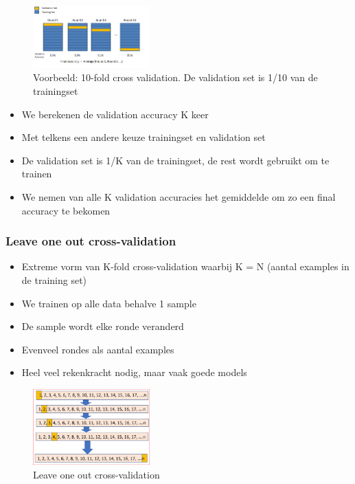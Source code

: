 \documentclass{article}
\begin{document}
\begin{figure}[H]
    \centering
    \includegraphics[width=0.4\textwidth]{cross-validation-kfold.png}
    \caption{Voorbeeld: 10-fold cross validation. De validation set is 1/10 van de trainingset}
\end{figure}

\begin{itemize}
    \item We berekenen de validation accuracy K keer
    \item Met telkens een andere keuze trainingset en validation set
    \item De validation set is 1/K van de trainingset, de rest wordt gebruikt om te trainen
    \item We nemen van alle K validation accuracies het gemiddelde om zo een final accuracy te bekomen
\end{itemize}

\subsubsection{Leave one out cross-validation}

\begin{itemize}
    \item Extreme vorm van K-fold cross-validation waarbij K = N (aantal examples in de training set)
    \item We trainen op alle data behalve 1 sample
    \item De sample wordt elke ronde veranderd
    \item Evenveel rondes als aantal examples
    \item Heel veel rekenkracht nodig, maar vaak goede models
\end{itemize}

\begin{figure}[H]
    \centering
    \includegraphics[width=0.4\textwidth]{cross-validation-leaveoneout.png}
    \caption{Leave one out cross-validation}
\end{figure}
\end{document}
